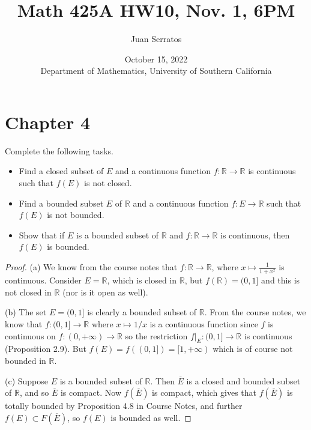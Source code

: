 \documentclass[oneside]{amsart}
\title{Math 425A HW10, Nov. 1, 6PM}
\author{Juan Serratos}
\date{October 15, 2022 \\ {Department of Mathematics, University of Southern California}}
\theoremstyle{definition}
\newcommand{\rr}{\mathbb R}
\begin{document}
\maketitle
\setcounter{tocdepth}{4}
\setcounter{secnumdepth}{4}
 \section{Chapter 4}

\begin{tcolorbox}[colback=black!5!white,colframe=black!75!black,title= Chapter $5$; $\S 2.3$: Exercise $2.6.$] Complete the following tasks.
\begin{itemize}
	\item [(a)] Find a closed subset of $E$ and a continuous function $f \colon \rr \to \rr$ is continuous such that $f(E)$ is not closed.
	\item [(b)] Find a bounded subset $E$ of $\rr$ and a continuous function $f \colon E \to \rr$ such that $f(E)$ is not bounded.
	\item [(c)] Show that if $E$ is a bounded subset of $\rr$ and $f \colon \rr \to \rr$ is continuous, then $f(E)$ is bounded.
\end{itemize}
\tcblower 
\begin{proof} (a) We know from the course notes that $f \colon \rr \to \rr$, where $x \mapsto \frac{1}{1+x^2}$ is continuous. Consider $E = \rr$, which is closed in $\rr$, but $f(\rr) = (0, 1]$ and this is not closed in $\rr$ (nor is it open as well).

(b) The set $E = (0,1]$ is clearly a bounded subset of $\rr$. From the course notes, we know that $f \colon (0,1] \to \rr$ where $x \mapsto 1/x$ is a continuous function since $f$ is continuous on $f \colon (0, + \infty) \to \rr$ so the restriction $f|_E \colon (0,1] \to \rr$ is continuous (Proposition 2.9). But $f(E) = f((0,1]) = [1, + \infty)$ which is of course not bounded in $\rr$.

(c) Suppose $E$ is a bounded subset of $\rr$. Then $\overline{E}$ is a closed and bounded subset of $\rr$, and so $\overline{E}$ is compact. Now $f(\overline{E})$ is compact, which gives that $f(\overline{E})$ is totally bounded by Proposition 4.8 in Course Notes, and further $f(E) \subset F(\overline{E})$, so $f(E)$ is bounded as well. 
\end{proof}
\end{tcolorbox}
\end{document}
